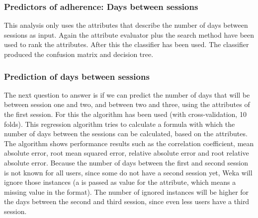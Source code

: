 \subsubsection{Predictors of adherence: Days between sessions}
This analysis only uses the attributes that describe the number of days between sessions as input. Again the  attribute evaluator plus the  search method have been used to rank the attributes. After this the  classifier has been used. The classifier produced the confusion matrix and decision tree.

\subsubsection{Prediction of days between sessions}
The next question to answer is if we can predict the number of days that will be between session one and two, and between two and three, using the attributes of the first session. For this the  algorithm has been used (with cross-validation, 10 folds). This regression algorithm tries to calculate a formula with which the number of days between the sessions can be calculated, based on the attributes. The algorithm shows performance results such as the correlation coefficient, mean absolute error, root mean squared error, relative absolute error and root relative absolute error. Because the number of days between the first and second session is not known for all users, since some do not have a second session yet, Weka will ignore those instances (a  is passed as value for the attribute, which means a missing value in the  format). The number of ignored instances will be higher for the days between the second and third session, since even less users have a third session.










